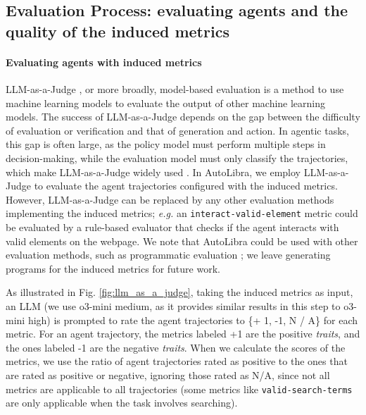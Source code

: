 \subsection{Evaluation Process: evaluating agents and the quality of the induced metrics}
\label{sec:evaluation_process}
\paragraph{Evaluating agents with induced metrics}
LLM-as-a-Judge \citep{zheng2023judging},
or more broadly, model-based evaluation
\citep{zhang2019bertscore,celikyilmaz2021evaluationtextgenerationsurvey}
is a method to use machine learning models to evaluate the output of other machine learning models.
The success of LLM-as-a-Judge depends on the gap between the difficulty of evaluation or verification and
that of generation and action. 
In agentic tasks, this gap is often large, as the policy model must perform multiple steps in decision-making, while the evaluation model must only
classify the trajectories, which make LLM-as-a-Judge widely used \citep{zhouwebarena,he2024webvoyager,zhousotopia}.
In AutoLibra, we employ LLM-as-a-Judge to
evaluate the agent trajectories configured with the induced metrics. However, LLM-as-a-Judge
can be replaced by any other evaluation methods implementing the induced metrics;
\emph{e.g.} an \texttt{interact-valid-element} metric
could be evaluated by a rule-based evaluator that checks if the agent
interacts with valid elements on the webpage. We note that AutoLibra could be used with other evaluation methods, such as
programmatic evaluation \citep{maeureka}; we leave generating programs for the induced metrics for future work.

As illustrated in Fig. \ref{fig:llm_as_a_judge}, taking the induced metrics as input, an LLM (we use o3-mini medium,
as it provides similar results in this step to o3-mini high) is prompted to rate the agent trajectories to \{+ 1, -1, N / A\} for each metric. For an agent trajectory, the metrics labeled +1 are
the positive \emph{traits}, and the ones labeled -1 are the negative \emph{traits}. When we calculate the scores of
the metrics, we use the ratio of agent trajectories rated as positive
to the ones that are rated as positive or negative, ignoring those rated as N/A,
since not all metrics are applicable to all trajectories
(some metrics like \texttt{valid-search-terms} are only applicable when the task
involves searching). 

